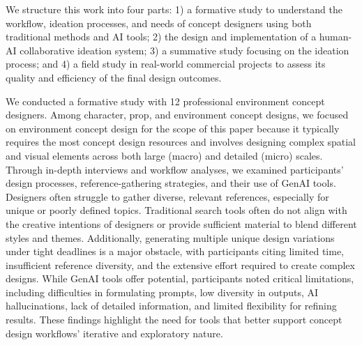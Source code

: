 We structure this work into four parts: 1) a formative study to understand the workflow, ideation processes, and needs of concept designers using both traditional methods and AI tools; 2) the design and implementation of a human-AI collaborative ideation system; 3) a summative study focusing on the ideation process; and 4) a field study in real-world commercial projects to assess its quality and efficiency of the final design outcomes.

We conducted a formative study with 12 professional environment concept designers. Among character, prop, and environment concept designs, we focused on environment concept design for the scope of this paper because it typically requires the most concept design resources and involves designing complex spatial and visual elements across both large (macro) and detailed (micro) scales. Through in-depth interviews and workflow analyses, we examined participants' design processes, reference-gathering strategies, and their use of GenAI tools.
Designers often struggle to gather diverse, relevant references, especially for unique or poorly defined topics. Traditional search tools often do not align with the creative intentions of designers or provide sufficient material to blend different styles and themes.
Additionally, generating multiple unique design variations under tight deadlines is a major obstacle, with participants citing limited time, insufficient reference diversity, and the extensive effort required to create complex designs. While GenAI tools offer potential, participants noted critical limitations, including difficulties in formulating prompts, low diversity in outputs, AI hallucinations, lack of detailed information, and limited flexibility for refining results. These findings highlight the need for tools that better support concept design workflows' iterative and exploratory nature.




